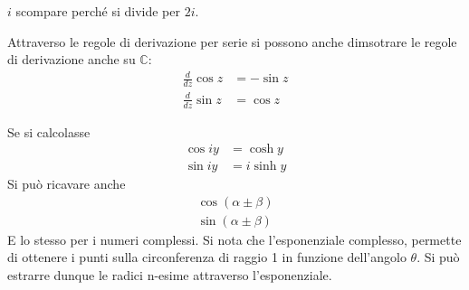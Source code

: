 \documentclass[a4paper, oneside]{article}
\begin{document}
$ i$ scompare perché si divide per $2i$. 
\begin{definition}
    Attraverso le regole di derivazione per serie si possono anche 
    dimsotrare le regole di derivazione anche su $\mathbb{C}$: 
    \begin{align}
        \frac{d}{dz} \cos z &= - \sin z \\
        \frac{d}{dz} \sin z &= \cos z
    \end{align}
\end{definition} \noindent
Se si calcolasse
\begin{align*}
    \cos iy &= \cosh y \\
    \sin iy &= i \sinh y
\end{align*}
Si può ricavare anche 
\begin{gather*}
    \cos(\alpha \pm \beta ) \\
    \sin(\alpha \pm \beta )
\end{gather*}
E lo stesso per i numeri complessi. Si nota che l'esponenziale complesso,
permette di ottenere i punti sulla circonferenza di raggio 1 in funzione 
dell'angolo $\theta$. Si può estrarre dunque le radici n-esime attraverso l'esponenziale.
 
\end{document}
